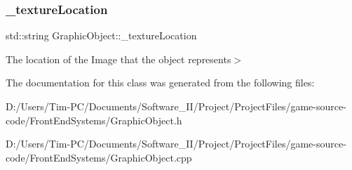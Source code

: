 \subsubsection{\texorpdfstring{\+\_\+texture\+Location}{\_textureLocation}}
{\footnotesize\ttfamily std\+::string Graphic\+Object\+::\+\_\+texture\+Location\hspace{0.3cm}{\ttfamily [protected]}}

The location of the Image that the object represents$>$ 

The documentation for this class was generated from the following files\+:\begin{DoxyCompactItemize}
\item 
D\+:/\+Users/\+Tim-\/\+P\+C/\+Documents/\+Software\+\_\+\+I\+I/\+Project/\+Project\+Files/game-\/source-\/code/\+Front\+End\+Systems/Graphic\+Object.\+h\item 
D\+:/\+Users/\+Tim-\/\+P\+C/\+Documents/\+Software\+\_\+\+I\+I/\+Project/\+Project\+Files/game-\/source-\/code/\+Front\+End\+Systems/Graphic\+Object.\+cpp\end{DoxyCompactItemize}
